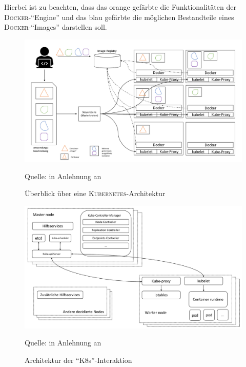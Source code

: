 Hierbei ist zu beachten, dass das orange gefärbte die Funktionalitäten der \textsc{Docker}-\enquote{Engine} und das blau gefärbte die möglichen Bestandteile eines \textsc{Docker}-\enquote{Images} darstellen soll.


\begin{figure}[H]
	\centering
	\includegraphics[scale=0.46]{img/k8sArch.pdf}
	\caption{Überblick über eine \textsc{Kubernetes}-Architektur}
	{\footnotesize Quelle: in Anlehnung an \cite[][S.\,23]{luksa_kubernetes_2018}}
	\label{abb:k8sArch}
\end{figure}

\begin{figure}[H]
	\centering
	\includegraphics[scale=0.46]{img/k8sArchInteraktion.pdf}
	\caption{Architektur der \enquote{\ac{K8s}}-Interaktion}
	{\footnotesize Quelle: in Anlehnung an \cite[][S.\,15]{caban_architecting_2019}}
	\label{abb:k8sArchInteraktion}
\end{figure}


